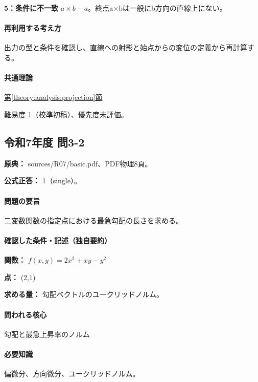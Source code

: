 \noindent\textbf{5：条件に不一致} \(a\times b-a\)。終点a×bは一般にb方向の直線上にない。\par

\paragraph{再利用する考え方} 出力の型と条件を確認し、直線への射影と始点からの変位の定義から再計算する。

\paragraph{共通理論} \hyperref[theory:analysis:projection]{第\ref*{theory:analysis:projection}節}

\par 難易度 1（校準初稿）、優先度未評価。

\subsection{令和7年度 問3-2}
\label{q:r07-reg-basic-3-2}

\noindent\textbf{原典：} sources/R07/basic.pdf、PDF物理8頁。

\textbf{公式正答：} 1（single）。

\paragraph{問題の要旨} 二変数関数の指定点における最急勾配の長さを求める。

\paragraph{確認した条件・記述（独自要約）}\mbox{}\par

\noindent\textbf{関数：} \(f(x,y)=2x^2+xy-y^2\)\par

\noindent\textbf{点：} (2,1)\par

\noindent\textbf{求める量：} 勾配ベクトルのユークリッドノルム。\par

\paragraph{問われる核心} 勾配と最急上昇率のノルム

\paragraph{必要知識} 偏微分、方向微分、ユークリッドノルム。

